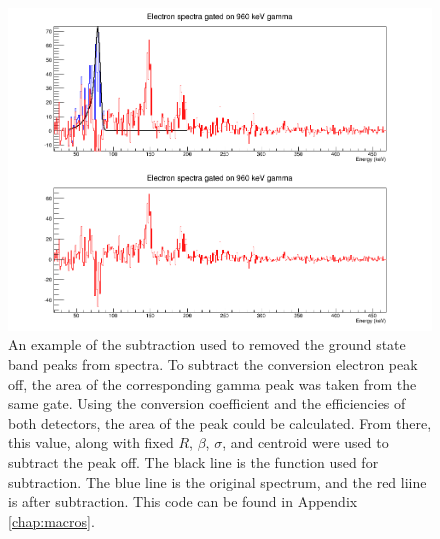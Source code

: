 \begin{figure}
    \centering
    \includegraphics[scale=0.4]{Analysis_Figs/Subtraction_SiLiAll_960.png}
    \caption{An example of the subtraction used to removed the ground state band peaks from spectra. To subtract the conversion electron peak off, the area of the corresponding gamma peak was taken from the same gate. Using the conversion coefficient and the efficiencies of both detectors, the area of the peak could be calculated. From there, this value, along with fixed $R$, $\beta$, $\sigma$, and centroid were used to subtract the peak off. The black line is the function used for subtraction. The blue line is the original spectrum, and the red liine is after subtraction. This code can be found in Appendix \ref{chap:macros}.}
    \label{fig:subtraction}
\end{figure}